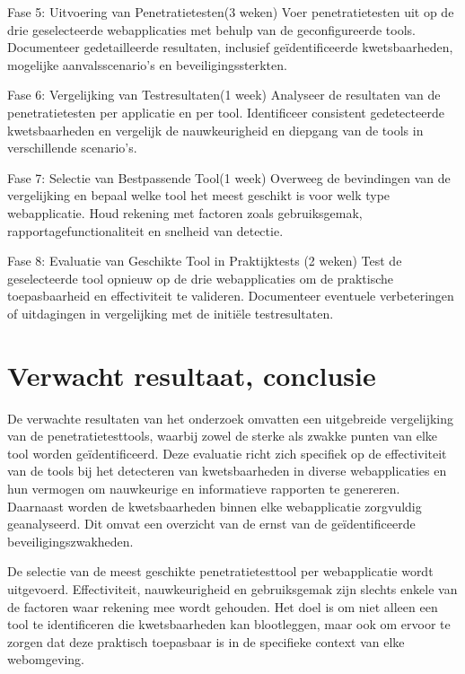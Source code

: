 Fase 5: Uitvoering van Penetratietesten(3 weken)
Voer penetratietesten uit op de drie geselecteerde
webapplicaties met behulp van de geconfigureerde
tools. Documenteer gedetailleerde resultaten,
inclusief geïdentificeerde kwetsbaarheden,
mogelijke aanvalsscenario's en beveiligingssterkten.

Fase 6: Vergelijking van Testresultaten(1 week)
Analyseer de resultaten van de penetratietesten
per applicatie en per tool. Identificeer consistent
gedetecteerde kwetsbaarheden en vergelijk de
nauwkeurigheid en diepgang van de tools in verschillende
scenario's.

Fase 7: Selectie van Bestpassende Tool(1 week)
Overweeg de bevindingen van de vergelijking en
bepaal welke tool het meest geschikt is voor welk
type webapplicatie. Houd rekening met factoren
zoals gebruiksgemak, rapportagefunctionaliteit
en snelheid van detectie.

Fase 8: Evaluatie van Geschikte Tool in Praktijktests
(2 weken) Test de geselecteerde tool opnieuw
op de drie webapplicaties om de praktische
toepasbaarheid en effectiviteit te valideren.
Documenteer eventuele verbeteringen of uitdagingen
in vergelijking met de initiële testresultaten.
\section{Verwacht resultaat, conclusie}%
\label{sec:verwachte_resultaten}

De verwachte resultaten van het onderzoek
omvatten een uitgebreide vergelijking van de penetratietesttools,
waarbij zowel de sterke als zwakke
punten van elke tool worden geïdentificeerd. Deze
evaluatie richt zich specifiek op de effectiviteit van
de tools bij het detecteren van kwetsbaarheden
in diverse webapplicaties en hun vermogen om
nauwkeurige en informatieve rapporten te genereren.
Daarnaast worden de kwetsbaarheden binnen
elke webapplicatie zorgvuldig geanalyseerd. Dit
omvat een overzicht van de ernst van de geïdentificeerde
beveiligingszwakheden.

De selectie van de meest geschikte penetratietesttool
per webapplicatie wordt uitgevoerd.
Effectiviteit, nauwkeurigheid en gebruiksgemak
zijn slechts enkele van de factoren waar rekening
mee wordt gehouden. Het doel is om niet alleen
een tool te identificeren die kwetsbaarheden kan
blootleggen, maar ook om ervoor te zorgen dat
deze praktisch toepasbaar is in de specifieke context
van elke webomgeving.

